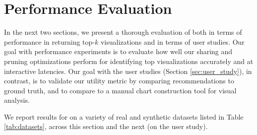 \section{Performance Evaluation}
\label{sec:experiments}
 
In the next two sections, we present a thorough evaluation of \SeeDB both in terms
of performance in returning top-$k$ visualizations and in terms of user 
studies.
Our goal with performance experiments is to evaluate how well our sharing and pruning
optimizations perform for identifying top visualizations accurately and at interactive
latencies.
Our goal with the user studies (Section \ref{sec:user_study}), in contrast, is to validate 
our utility metric by comparing \SeeDB recommendations to ground truth, and to compare 
\SeeDB to a manual chart construction tool for visual analysis.

We report results for \SeeDB on a variety of real and synthetic datasets listed in Table 
\ref{tab:datasets}, across this section and the next (on the user study).

